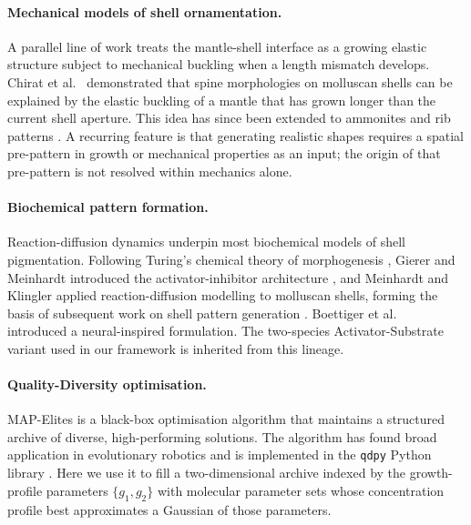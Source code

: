 \documentclass[11pt]{article}
\begin{document}
\paragraph{Mechanical models of shell ornamentation.} A parallel line of
work treats the mantle-shell interface as a growing elastic structure
subject to mechanical buckling when a length mismatch develops. Chirat et
al.\ \citep{chirat2013mechanical} demonstrated that spine morphologies on
molluscan shells can be explained by the elastic buckling of a mantle that
has grown longer than the current shell aperture. This idea has since been
extended to ammonites and rib patterns
\citep{moulton2015morpho,erlich2016morphomechanics}. A recurring feature is
that generating realistic shapes requires a spatial pre-pattern in growth
or mechanical properties as an input; the origin of that pre-pattern is not
resolved within mechanics alone.

\paragraph{Biochemical pattern formation.} Reaction-diffusion dynamics
underpin most biochemical models of shell pigmentation. Following Turing's
chemical theory of morphogenesis \citep{turing1952chemical}, Gierer and
Meinhardt introduced the activator-inhibitor architecture
\citep{gierer1972theory}, and Meinhardt and Klingler
\citep{meinhardt1987model} applied reaction-diffusion modelling to
molluscan shells, forming the basis of subsequent work on shell pattern
generation \citep{fowler1992modeling,meinhardt1995algorithmic}. Boettiger
et al.\ \citep{boettiger2009neural} introduced a neural-inspired
formulation. The two-species Activator-Substrate variant used in our
framework is inherited from this lineage.

\paragraph{Quality-Diversity optimisation.} MAP-Elites
\citep{mouret2015illuminating} is a black-box optimisation algorithm that
maintains a structured archive of diverse, high-performing solutions. The
algorithm has found broad application in evolutionary robotics
\citep{cully2015robots} and is implemented in the \texttt{qdpy} Python
library \citep{cazenille2018qdpy}. Here we use it to fill a
two-dimensional archive indexed by the growth-profile parameters
$\{g_1, g_2\}$ with molecular parameter sets whose concentration profile
best approximates a Gaussian of those parameters.
\end{document}
